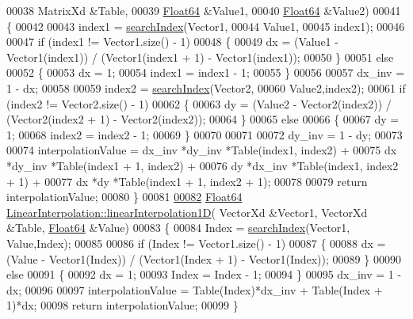 \begin{DoxyCode}
00038                                                    MatrixXd &Table,
00039                                                    \hyperlink{group___tools_ga3f1431cb9f76da10f59246d1d743dc2c}{Float64} &Value1,
00040                                                    \hyperlink{group___tools_ga3f1431cb9f76da10f59246d1d743dc2c}{Float64} &Value2)
00041 \{
00042 
00043     index1 = \hyperlink{class_linear_interpolation_aa9faf7177964de6d3b68a69cdbf7ef1a}{searchIndex}(Vector1,
00044                          Value1, 
00045                          index1);
00046 
00047     \textcolor{keywordflow}{if} (index1 != Vector1.size() - 1)
00048     \{
00049         dx = (Value1 - Vector1(index1)) / (Vector1(index1 + 1) - Vector1(index1));
00050     \}
00051     \textcolor{keywordflow}{else}
00052     \{
00053         dx = 1;
00054         index1 = index1 - 1;
00055     \}
00056     
00057     dx\_inv = 1 - dx;
00058 
00059     index2 = \hyperlink{class_linear_interpolation_aa9faf7177964de6d3b68a69cdbf7ef1a}{searchIndex}(Vector2,
00060                         Value2,index2);
00061     \textcolor{keywordflow}{if} (index2 != Vector2.size() - 1)
00062     \{
00063         dy = (Value2 - Vector2(index2)) / (Vector2(index2 + 1) - Vector2(index2));
00064     \}
00065     \textcolor{keywordflow}{else}
00066     \{
00067         dy = 1;
00068         index2 = index2 - 1;
00069     \}
00070     
00071 
00072     dy\_inv = 1 - dy;
00073 
00074     interpolationValue =    dx\_inv  *dy\_inv *Table(index1, index2) +
00075                             dx      *dy\_inv *Table(index1 + 1, index2) +
00076                             dy      *dx\_inv *Table(index1, index2 + 1) +
00077                             dx      *dy     *Table(index1 + 1, index2 + 1);
00078 
00079     \textcolor{keywordflow}{return} interpolationValue;
00080 \}
00081 
\hyperlink{class_linear_interpolation_aee1cf48d321cf6708470d9119fbf79e4}{00082} \hyperlink{group___tools_ga3f1431cb9f76da10f59246d1d743dc2c}{Float64} \hyperlink{class_linear_interpolation_aee1cf48d321cf6708470d9119fbf79e4}{LinearInterpolation::linearInterpolation1D}(
      VectorXd &Vector1, VectorXd &Table, \hyperlink{group___tools_ga3f1431cb9f76da10f59246d1d743dc2c}{Float64} &Value)
00083 \{
00084     Index = \hyperlink{class_linear_interpolation_aa9faf7177964de6d3b68a69cdbf7ef1a}{searchIndex}(Vector1, Value,Index);
00085 
00086     \textcolor{keywordflow}{if} (Index != Vector1.size() - 1)
00087     \{
00088         dx = (Value - Vector1(Index)) / (Vector1(Index + 1) - Vector1(Index));
00089     \}
00090     \textcolor{keywordflow}{else}
00091     \{
00092         dx = 1;
00093         Index = Index - 1;
00094     \}
00095     dx\_inv = 1 - dx;
00096 
00097     interpolationValue = Table(Index)*dx\_inv + Table(Index + 1)*dx;
00098     \textcolor{keywordflow}{return} interpolationValue;
00099 \}
\end{DoxyCode}
